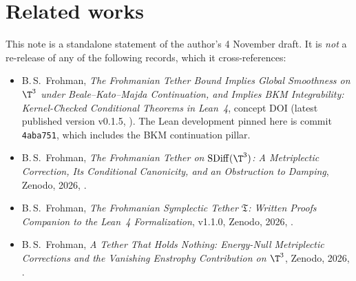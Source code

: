 \documentclass[11pt]{article}
\newcommand{\pinshort}{4aba751}
\begin{document}
\section{Related works}
This note is a standalone statement of the author's 4 November draft. It is \emph{not} a
re-release of any of the following records, which it cross-references:
\begin{itemize}
\item B.\,S.~Frohman, \emph{The Frohmanian Tether Bound Implies Global Smoothness on $\T^3$ under
Beale--Kato--Majda Continuation, and Implies BKM Integrability: Kernel-Checked Conditional Theorems
in Lean~4}, concept DOI  (latest published version v0.1.5,
). The Lean development pinned here is commit \texttt{\pinshort}, which
includes the BKM continuation pillar.
\item B.\,S.~Frohman, \emph{The Frohmanian Tether on $\mathrm{SDiff}(\T^3)$: A Metriplectic
Correction, Its Conditional Canonicity, and an Obstruction to Damping}, Zenodo, 2026,
.
\item B.\,S.~Frohman, \emph{The Frohmanian Symplectic Tether $\mathfrak T$: Written Proofs Companion
to the Lean~4 Formalization}, v1.1.0, Zenodo, 2026, .
\item B.\,S.~Frohman, \emph{A Tether That Holds Nothing: Energy-Null Metriplectic Corrections and
the Vanishing Enstrophy Contribution on $\T^3$}, Zenodo, 2026, .
\end{itemize}

\end{document}
